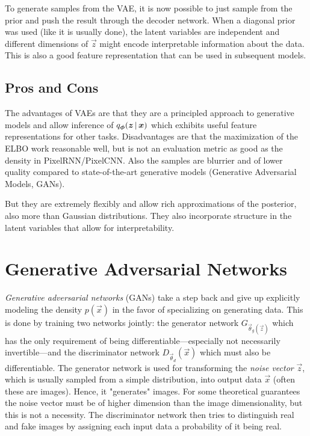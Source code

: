 			To generate samples from the VAE, it is now possible to just sample from the prior and push the result through the decoder network. When a diagonal prior was used (like it is usually done), the latent variables are independent and different dimensions of \(\vec{z}\) might encode interpretable information about the data. This is also a good feature representation that can be used in subsequent models.

		\subsection{Pros and Cons}
			The advantages of VAEs are that they are a principled approach to generative models and allow inference of \( q_{\bm{\phi}}(\bm{z} \,\vert\, \bm{x}) \) which exhibits useful feature representations for other tasks. Disadvantages are that the maximization of the ELBO work reasonable well, but is not an evaluation metric as good as the density in PixelRNN/PixelCNN. Also the samples are blurrier and of lower quality compared to state-of-the-art generative models (Generative Adversarial Models, GANs).

			But they are extremely flexibly and allow rich approximations of the posterior, also more than Gaussian distributions. They also incorporate structure in the latent variables that allow for interpretability.

	\section{Generative Adversarial Networks}
		\emph{Generative adversarial networks} (GANs) take a step back and give up explicitly modeling the density \( p(\vec{x}) \) in the favor of specializing on generating data. This is done by training two networks jointly: the generator network \( G_{\vec{\theta}_g(\vec{z})} \) which has the only requirement of being differentiable---especially not necessarily invertible---and the discriminator network \( D_{\vec{\theta}_d}(\vec{x}) \) which must also be differentiable. The generator network is used for transforming the \emph{noise vector} \(\vec{z}\), which is usually sampled from a simple distribution, into output data \(\vec{x}\) (often these are images). Hence, it "generates" images. For some theoretical guarantees the noise vector must be of higher dimension than the image dimensionality, but this is not a necessity. The discriminator network then tries to distinguish real and fake images by assigning each input data a probability of it being real.

